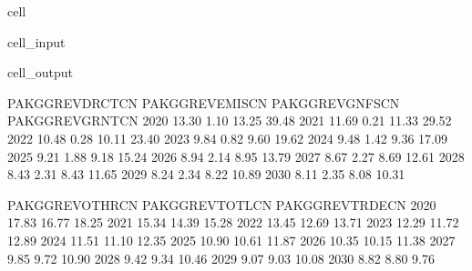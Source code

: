 \documentclass[letterpaper,10pt,english]{jupyterBook}
\begin{document}
\begin{sphinxuseclass}{cell}\begin{sphinxVerbatimInput}

\begin{sphinxuseclass}{cell_input}
\begin{sphinxVerbatim}[commandchars=\\\{\}]
 
    \PYG{p}{[}\PYG{p}{]}
\end{sphinxVerbatim}

\end{sphinxuseclass}\end{sphinxVerbatimInput}
\begin{sphinxVerbatimOutput}

\begin{sphinxuseclass}{cell_output}
\begin{sphinxVerbatim}[commandchars=\\\{\}]
      PAKGGREVDRCTCN  PAKGGREVEMISCN  PAKGGREVGNFSCN  PAKGGREVGRNTCN   
2020           13.30            1.10           13.25           39.48  \PYGZbs{}
2021           11.69            0.21           11.33           29.52   
2022           10.48            0.28           10.11           23.40   
2023            9.84            0.82            9.60           19.62   
2024            9.48            1.42            9.36           17.09   
2025            9.21            1.88            9.18           15.24   
2026            8.94            2.14            8.95           13.79   
2027            8.67            2.27            8.69           12.61   
2028            8.43            2.31            8.43           11.65   
2029            8.24            2.34            8.22           10.89   
2030            8.11            2.35            8.08           10.31   

      PAKGGREVOTHRCN  PAKGGREVTOTLCN  PAKGGREVTRDECN  
2020           17.83           16.77           18.25  
2021           15.34           14.39           15.28  
2022           13.45           12.69           13.71  
2023           12.29           11.72           12.89  
2024           11.51           11.10           12.35  
2025           10.90           10.61           11.87  
2026           10.35           10.15           11.38  
2027            9.85            9.72           10.90  
2028            9.42            9.34           10.46  
2029            9.07            9.03           10.08  
2030            8.82            8.80            9.76  
\end{sphinxVerbatim}

\end{sphinxuseclass}\end{sphinxVerbatimOutput}

\end{sphinxuseclass}
\end{document}
